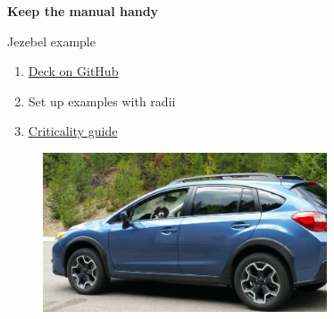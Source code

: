 \documentclass[aspectratio=1610,pdftex,dvipsnames,compress,xcolor={dvipsnames}]{beamer}
\newcommand{\acs}{\acrshort} %
\begin{document}
\begin{frame}[plain]{}
    \centering\LARGE\textbf{Keep the manual handy}
\end{frame}


\addtocounter{framenumber}{-1} 
\begin{frame}{Jezebel example}
    \begin{enumerate}[series=techniques,topsep=0pt,itemsep=21pt,leftmargin=*,label=(\arabic*)]
        \item[]\href{https://github.com/TheDoctorRAB/mcnpx.decks/blob/master/criticality/jezebel.inp}{Deck on GitHub}
        \item[]Set up examples with radii
        \item[]\href{https://www.osti.gov/servlets/purl/10171566}{Criticality guide}
    \end{enumerate}
\end{frame}


\begin{frame}[plain]{}
    \begin{figure}
        \centering
        \includegraphics[width=0.75\textwidth]{final.jpg}
    \end{figure}
\end{frame}


%
%
%



%    
%    
\end{document}
